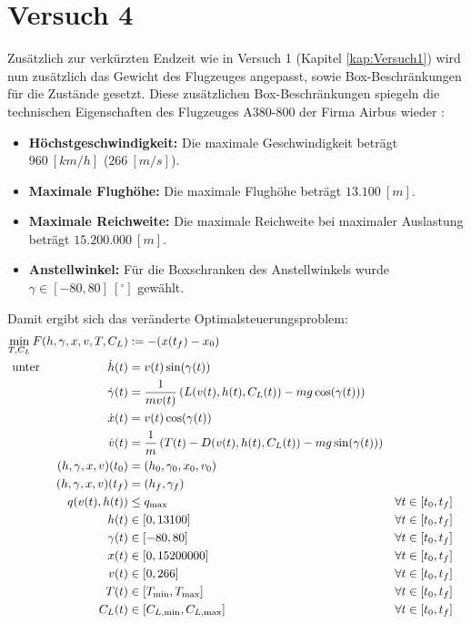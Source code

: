 \section{Versuch 4}\label{kap:Versuch4}
Zusätzlich zur verkürzten Endzeit wie in Versuch 1 (Kapitel \ref{kap:Versuch1}) wird nun zusätzlich das Gewicht des Flugzeuges angepasst, sowie Box-Beschränkungen für die Zustände gesetzt. Diese zusätzlichen Box-Beschränkungen spiegeln die technischen Eigenschaften des Flugzeuges A380-800 der Firma Airbus wieder \cite{A380Tech}:
\begin{itemize}
\item \textbf{Höchstgeschwindigkeit:} Die maximale Geschwindigkeit beträgt $960 \ [km/h]$ ($266 \ [m/s]$).
%
\item \textbf{Maximale Flughöhe:} Die maximale Flughöhe beträgt $13.100 \ [m]$.
%
\item \textbf{Maximale Reichweite:} Die maximale Reichweite bei maximaler Auslastung beträgt $15.200.000 \ [m]$.
%
\item \textbf{Anstellwinkel:} Für die Boxschranken des Anstellwinkels wurde $\gamma \in [-80,80] \ [^{\circ}]$ gewählt. 
\end{itemize}
Damit ergibt sich das veränderte Optimalsteuerungsproblem:
\begin{align*}
\min_{T, C_L} F(h,\gamma,x,v,T,C_L) &:= -(x(t_f) - x_0) \\
\text{unter} \hspace{20mm} \dot{h}(t) &= v(t) \sin(\gamma(t)) \\
\dot{\gamma}(t) &=  \dfrac{1}{mv(t)} \left( L(v(t),h(t),C_L(t)) - mg \cos(\gamma(t)) \right) \\
\dot{x}(t) &= v(t) \cos(\gamma(t))\\
\dot{v}(t) &= \dfrac{1}{m} \left( T(t) - D(v(t),h(t),C_L(t)) - mg \sin(\gamma(t)) \right) \\
(h,\gamma,x,v)(t_0) &= (h_0,\gamma_0,x_0,v_0) \\
(h,\gamma,x,v)(t_f) &= (h_f,\gamma_f) \hspace{36mm} \\
q(v(t),h(t)) &\leq q_{\max} & & \forall t \in [t_0,t_f] \\
h(t) &\in [0,13100] & & \forall t \in [t_0,t_f] \\
\gamma(t) &\in [-80,80] & & \forall t \in [t_0,t_f] \\
x(t) &\in [0,15200000] & & \forall t \in [t_0,t_f] \\
v(t) &\in [0,266] & & \forall t \in [t_0,t_f] \\
T(t) &\in [T_{\min},T_{\max}] & & \forall t \in [t_0,t_f] \\
C_L(t) &\in [C_{L, \min},C_{L, \max}] & & \forall t \in [t_0,t_f]
\end{align*}

